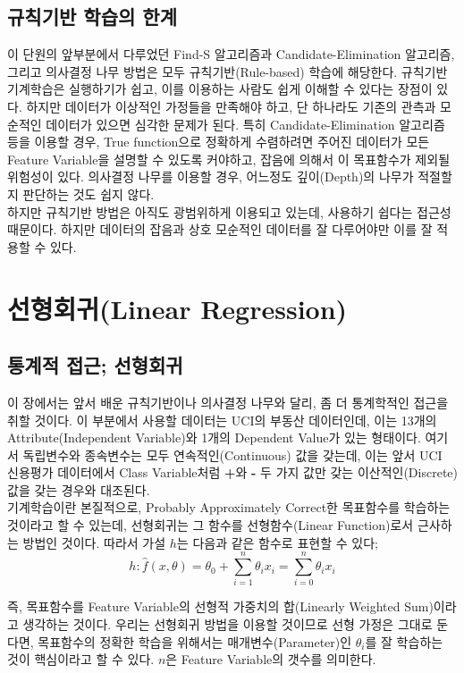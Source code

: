 \documentclass[a4paper]{oblivoir}
\begin{document}
\subsection{규칙기반 학습의 한계}
이 단원의 앞부분에서 다루었던 Find-S 알고리즘과 Candidate-Elimination 알고리즘, 그리고 의사결정 나무 방법은 모두 규칙기반(Rule-based) 학습에 해당한다. 규칙기반 기계학습은 실행하기가 쉽고, 이를 이용하는 사람도 쉽게 이해할 수 있다는 장점이 있다. 하지만 데이터가 이상적인 가정들을 만족해야 하고, 단 하나라도 기존의 관측과 모순적인 데이터가 있으면 심각한 문제가 된다. 특히 Candidate-Elimination 알고리즘 등을 이용할 경우, True function으로 정확하게 수렴하려면 주어진 데이터가 모든 Feature Variable을 설명할 수 있도록 커야하고, 잡음에 의해서 이 목표함수가 제외될 위험성이 있다. 의사결정 나무를 이용할 경우, 어느정도 깊이(Depth)의 나무가 적절할지 판단하는 것도 쉽지 않다. \\
\indent 하지만 규칙기반 방법은 아직도 광범위하게 이용되고 있는데, 사용하기 쉽다는 접근성 때문이다. 하지만 데이터의 잡음과 상호 모순적인 데이터를 잘 다루어야만 이를 잘 적용할 수 있다.

\section{선형회귀(Linear Regression)}

\subsection{통계적 접근; 선형회귀}
이 장에서는 앞서 배운 규칙기반이나 의사결정 나무와 달리, 좀 더 통계학적인 접근을 취할 것이다. 이 부분에서 사용할 데이터는 UCI의 부동산 데이터인데, 이는 13개의 Attribute(Independent Variable)와 1개의 Dependent Value가 있는 형태이다. 여기서 독립변수와 종속변수는 모두 연속적인(Continuous) 값을 갖는데, 이는 앞서 UCI 신용평가 데이터에서 Class Variable처럼 \textbf{+}와 \textbf{-} 두 가지 값만 갖는 이산적인(Discrete) 값을 갖는 경우와 대조된다. \\
\indent 기계학습이란 본질적으로, Probably Approximately Correct한 목표함수를 학습하는 것이라고 할 수 있는데, 선형회귀는 그 함수를 선형함수(Linear Function)로서 근사하는 방법인 것이다. 따라서 가설 $h$는 다음과 같은 함수로 표현할 수 있다;
\begin{equation}
h: \hat{f}(x, \theta) = \theta_{0} + \sum_{i=1}^{n}\theta_{i} x_{i} = \sum_{i=0}^{n}\theta_{i} x_{i} \tag{2-9}
\end{equation}

\indent 즉, 목표함수를 Feature Variable의 선형적 가중치의 합(Linearly Weighted Sum)이라고 생각하는 것이다. 우리는 선형회귀 방법을 이용할 것이므로 선형 가정은 그대로 둔다면, 목표함수의 정확한 학습을 위해서는 매개변수(Parameter)인 $\theta_{i}$를 잘 학습하는 것이 핵심이라고 할 수 있다. $n$은 Feature Variable의 갯수를 의미한다.
\end{document}
